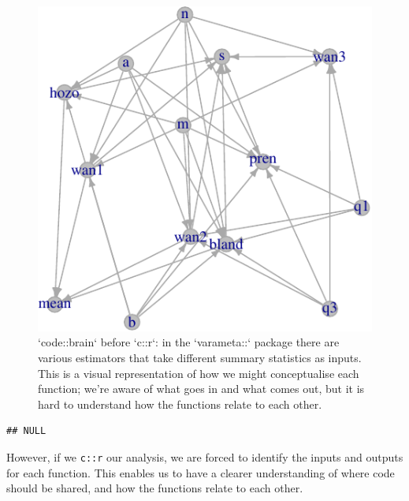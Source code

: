 \documentclass[
]{article}
\begin{document}
\begin{figure}

{\centering \includegraphics{when-is-done-done_files/figure-latex/codebrainbad-1} 

}

\caption{`code::brain` before `c::r`: in the `varameta::` package there are various estimators that take different summary statistics as inputs. This is a visual representation of how we might conceptualise each function; we're aware of what goes in and what comes out, but it is hard to understand how the functions relate to each other.}\label{fig:codebrainbad}
\end{figure}

\begin{verbatim}
## NULL
\end{verbatim}

However, if we \texttt{c::r} our analysis, we are forced to identify the inputs and outputs for each function. This enables us to have a clearer understanding of where code should be shared, and how the functions relate to each other.
\end{document}
